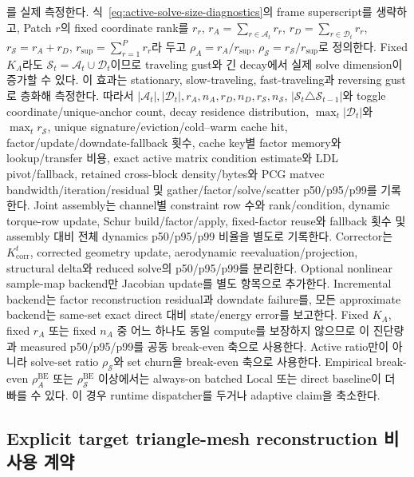 \documentclass[11pt,a4paper]{article}
\begin{document}
를 실제 측정한다.
식~\eqref{eq:active-solve-size-diagnostics}의 frame superscript를 생략하고,
Patch \(r\)의 fixed coordinate rank를 \(r_r\),
\(r_A=\sum_{r\in\mathcal A_t}r_r\),
\(r_D=\sum_{r\in\mathcal D_t}r_r\),
\(r_{\mathcal S}=r_A+r_D\),
\(r_{\mathrm{sup}}=\sum_{r=1}^P r_r\)라 두고
\(\rho_A=r_A/r_{\mathrm{sup}}\),
\(\rho_{\mathcal S}=r_{\mathcal S}/r_{\mathrm{sup}}\)로 정의한다.
Fixed \(K_A\)라도 \(\mathcal S_t=\mathcal A_t\cup\mathcal D_t\)이므로
traveling gust와 긴 decay에서 실제 solve dimension이 증가할 수 있다.
이 효과는 stationary, slow-traveling, fast-traveling과 reversing gust로 층화해 측정한다.
따라서 \(|\mathcal A_t|,|\mathcal D_t|,r_A,n_A,r_D,n_D,r_{\mathcal S},n_{\mathcal S}\),
\(|\mathcal S_t\triangle\mathcal S_{t-1}|\)와 toggle coordinate/unique-anchor count,
decay residence distribution, \(\max_t|\mathcal D_t|\)와 \(\max_t r_{\mathcal S}\),
unique signature/eviction/cold--warm cache hit, factor/update/downdate-fallback 횟수,
cache key별 factor memory와 lookup/transfer 비용,
exact active matrix condition estimate와 LDL pivot/fallback,
retained cross-block density/bytes와 PCG matvec bandwidth/iteration/residual 및
gather/factor/solve/scatter p50/p95/p99를 기록한다.
Joint assembly는 channel별 constraint row 수와 rank/condition,
dynamic torque-row update, Schur build/factor/apply, fixed-factor reuse와 fallback 횟수 및
assembly 대비 전체 dynamics p50/p95/p99 비율을 별도로 기록한다.
Corrector는 \(K_{\mathrm{corr}}^t\), corrected geometry update,
aerodynamic reevaluation/projection, structural delta와 reduced solve의 p50/p95/p99를 분리한다.
Optional nonlinear sample-map backend만 Jacobian update를 별도 항목으로 추가한다.
Incremental backend는 factor reconstruction residual과 downdate failure를,
모든 approximate backend는 same-set exact direct 대비 state/energy error를 보고한다.
Fixed \(K_A\), fixed \(r_A\) 또는 fixed \(n_A\) 중 어느 하나도 동일 compute를 보장하지 않으므로
이 진단량과 measured p50/p95/p99를 공동 break-even 축으로 사용한다.
Active ratio만이 아니라 solve-set ratio \(\rho_{\mathcal S}\)와 set churn을 break-even 축으로 사용한다.
Empirical break-even \(\rho_A^{\mathrm{BE}}\) 또는 \(\rho_{\mathcal S}^{\mathrm{BE}}\) 이상에서는
always-on batched Local 또는 direct baseline이 더 빠를 수 있다.
이 경우 runtime dispatcher를 두거나 adaptive claim을 축소한다.

\subsection{Explicit target triangle-mesh reconstruction 비사용 계약}
\end{document}
